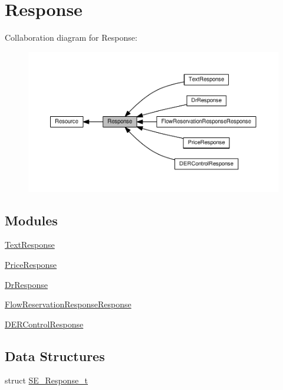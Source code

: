 \hypertarget{group__Response}{}\section{Response}
\label{group__Response}
Collaboration diagram for Response\+:\nopagebreak
\begin{figure}[H]
\begin{center}
\leavevmode
\includegraphics[width=350pt]{group__Response}
\end{center}
\end{figure}
\subsection*{Modules}
\begin{DoxyCompactItemize}
\item 
\hyperlink{group__TextResponse}{Text\+Response}
\item 
\hyperlink{group__PriceResponse}{Price\+Response}
\item 
\hyperlink{group__DrResponse}{Dr\+Response}
\item 
\hyperlink{group__FlowReservationResponseResponse}{Flow\+Reservation\+Response\+Response}
\item 
\hyperlink{group__DERControlResponse}{D\+E\+R\+Control\+Response}
\end{DoxyCompactItemize}
\subsection*{Data Structures}
\begin{DoxyCompactItemize}
\item 
struct \hyperlink{structSE__Response__t}{S\+E\+\_\+\+Response\+\_\+t}
\end{DoxyCompactItemize}
